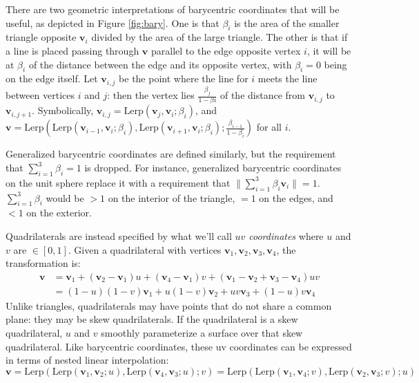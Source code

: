 \documentclass{amsart}[12pt]
\begin{document}
There are two geometric interpretations of barycentric coordinates that will be
useful, as depicted in Figure \ref{fig:bary}. One is that $\beta_i$ is the area
of the smaller triangle opposite $\mathbf v_i$ divided by the area of the large
triangle. The other is that if a line is placed passing through $\mathbf v$ parallel to
the edge opposite vertex $i$, it will be at $\beta_i$ of the distance between
the edge and its opposite vertex, with $\beta_i = 0$ being on the edge itself.
Let $\mathbf v_{i,j}$ be the point where the line for $i$ meets the line between
vertices $i$ and $j$: then the vertex lies $\frac{\beta_{j}}{1-\beta{i}}$
of the distance from $\mathbf v_{i,j}$ to $\mathbf v_{i,j+1}$. Symbolically,
$\mathbf v_{i,j} = \mathrm{Lerp}(\mathbf v_{j},\mathbf v_i;\beta_{i})$, and
$\mathbf v = \mathrm{Lerp}(\mathrm{Lerp}(\mathbf v_{i-1}, \mathbf v_i;
\beta_{i}), \mathrm{Lerp}(\mathbf v_{i+1}, \mathbf v_i; \beta_{i});
\frac{\beta_{i-1}}{1-\beta_{i}})$ for all $i$.

Generalized barycentric coordinates are defined similarly, but the requirement
that $\sum^3_{i=1} \beta_i = 1$ is dropped. For instance, generalized
barycentric coordinates on the unit sphere replace it with a requirement that
$\| \sum^3_{i=1} \beta_i \mathbf v_i \| = 1$. $\sum^3_{i=1} \beta_i$ would be
$>1$ on the interior of the triangle, $=1$ on the edges, and $<1$ on the exterior.

Quadrilaterals are instead specified by what we'll call \textit{$uv$
coordinates} where $u$ and $v$ are $\in [0, 1]$. Given a quadrilateral with
vertices $\mathbf v_1, \mathbf v_2, \mathbf v_3, \mathbf v_4$, the
transformation is:
\begin{equation}\begin{split}
\mathbf v & = \mathbf v_1 + (\mathbf v_2-\mathbf v_1) u + (\mathbf v_4-\mathbf v_1) v + (\mathbf v_1-\mathbf v_2+\mathbf v_3-\mathbf v_4)uv \\
& = (1-u)(1-v)\mathbf v_1 + u(1-v)\mathbf v_2 + uv\mathbf v_3 + (1-u)v \mathbf v_4
\end{split}\end{equation}
Unlike triangles, quadrilaterals may have points that do not share a common
plane: they may be skew quadrilaterals. If the quadrilateral is a skew
quadrilateral, $u$ and $v$ smoothly parameterize a surface over that skew
quadrilateral. Like barycentric coordinates, these uv coordinates can be expressed in terms of nested linear interpolation:
$\mathbf v
= \mathrm{Lerp}(\mathrm{Lerp}(\mathbf v_1,\mathbf v_2;u),\mathrm{Lerp}(\mathbf v_4,\mathbf v_3;u);v)
= \mathrm{Lerp}(\mathrm{Lerp}(\mathbf v_1,\mathbf v_4;v),\mathrm{Lerp}(\mathbf v_2,\mathbf v_3;v);u)$
\end{document}
